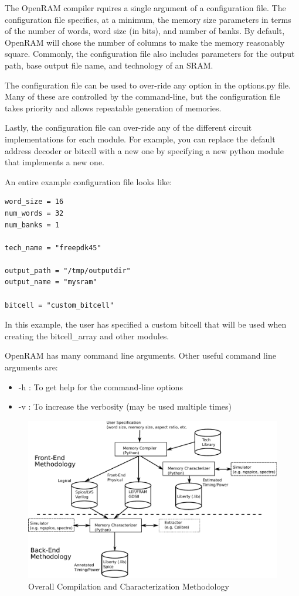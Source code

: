 The OpenRAM compiler rquires a single argument of a configuration
file. The configuration file specifies, at a minimum, the memory size
parameters in terms of the number of words, word size (in bits), and
number of banks. By default, OpenRAM will chose the number of columns
to make the memory reasonably square. Commonly, the configuration file
also includes parameters for the output path, base output file name,
and technology of an SRAM.

The configuration file can be used to over-ride any option in the
options.py file.  Many of these are controlled by the command-line,
but the configuration file takes priority and allows repeatable
generation of memories.

Lastly, the configuration file can over-ride any 
of the different circuit implementations for each module. For example, you
can replace the default address decoder or bitcell with a new one by
specifying a new python module that implements a new one.

An entire example configuration file looks like:
\begin{verbatim}
word_size = 16
num_words = 32
num_banks = 1

tech_name = "freepdk45"

output_path = "/tmp/outputdir"
output_name = "mysram"

bitcell = "custom_bitcell"
\end{verbatim}
In this example, the user has specified a custom bitcell that will be
used when creating the bitcell\_array and other modules.

OpenRAM has many command line arguments. Other useful command line arguments are:
\begin{itemize}
\item -h : To get help for the command-line options
\item -v : To increase the verbosity (may be used multiple times)
\end{itemize}

\begin{figure}[tb]
\centering
\includegraphics[width=14cm]{./figs/methodology.pdf}
\caption{Overall Compilation and Characterization Methodology
\label{fig:methodology}}
\end{figure}






